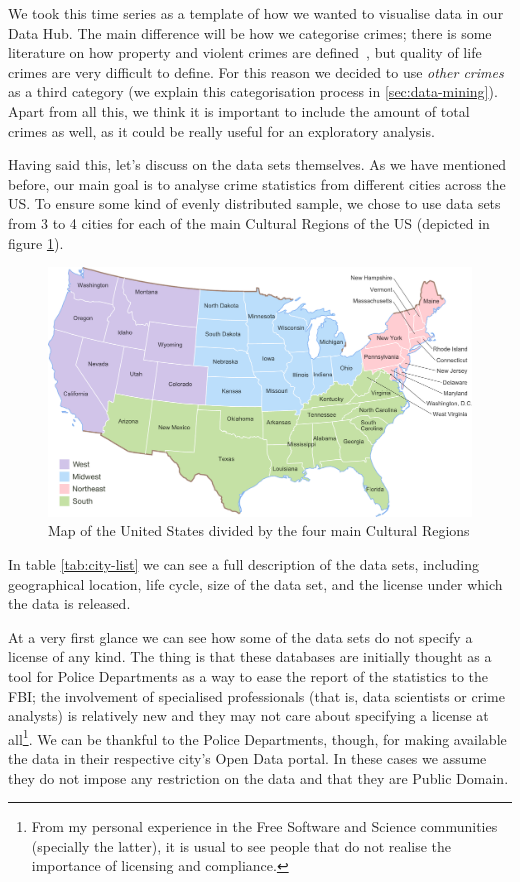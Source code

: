 We took this time series as a template of how we wanted to visualise data in our Data Hub. The main difference will be how we categorise crimes; there is some literature on how property and violent crimes are defined~\cite{Beardsley2014}, but quality of life crimes are very difficult to define. For this reason we decided to use \emph{other crimes} as a third category (we explain this categorisation process in \cref{sec:data-mining}). Apart from all this, we think it is important to include the amount of total crimes as well, as it could be really useful for an exploratory analysis.

\bigskip
Having said this, let's discuss on the data sets themselves. As we have mentioned before, our main goal is to analyse crime statistics from different cities across the US. To ensure some kind of evenly distributed sample, we chose to use data sets from 3 to 4 cities for each of the main Cultural Regions of the US (depicted in figure \ref{fig:us-map}).

\begin{figure}[H]
	\centering
	\includegraphics[width=\textwidth]{./images/us-map}
	\caption{Map of the United States divided by the four main Cultural Regions}
	\label{fig:us-map}
\end{figure}

In table \ref{tab:city-list} we can see a full description of the data sets, including geographical location, life cycle, size of the data set, and the license under which the data is released.

At a very first glance we can see how some of the data sets do not specify a license of any kind. The thing is that these databases are initially thought as a tool for Police Departments as a way to ease the report of the statistics to the FBI; the involvement of specialised professionals (that is, data scientists or crime analysts) is relatively new and they may not care about specifying a license at all\footnote{From my personal experience in the Free Software and Science communities (specially the latter), it is usual to see people that do not realise the importance of licensing and compliance.}. We can be thankful to the Police Departments, though, for making available the data in their respective city's Open Data portal. In these cases we assume they do not impose any restriction on the data and that they are Public Domain.

